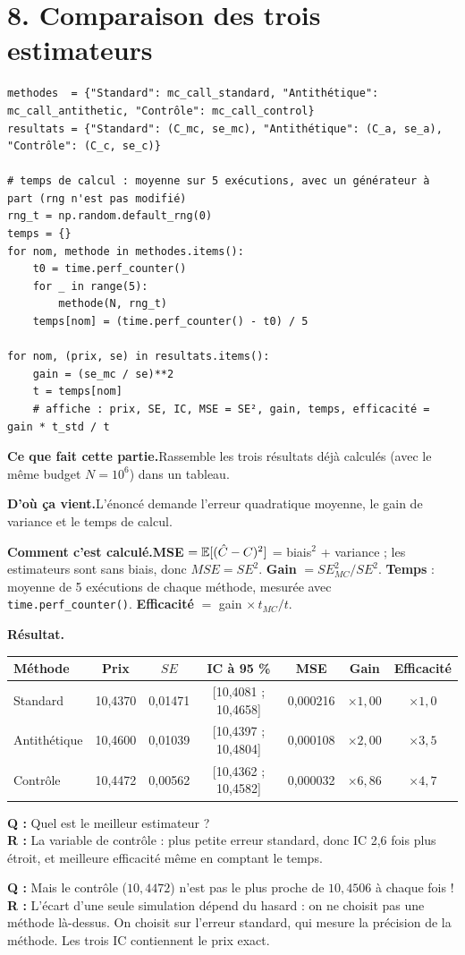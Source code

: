 \documentclass[11pt,a4paper]{article}
\newcommand{\quoi}[1]{\par\noindent\textbf{\color{bleu}Ce que fait cette partie.}\enspace #1\par}
\newcommand{\source}[1]{\par\noindent\textbf{\color{orange}D'où ça vient.}\enspace #1\par}
\newcommand{\calcul}[1]{\par\noindent\textbf{\color{bleu}Comment c'est calculé.}\enspace #1\par}
\newcommand{\resultat}[1]{\par\noindent\textbf{\color{vert}Résultat.}\enspace #1\par}
\newcommand{\prof}[2]{\begin{tcolorbox}[colback=orange!6,colframe=orange!80,boxrule=0.4pt,arc=2pt,left=5pt,right=5pt,top=2pt,bottom=2pt]\small\textbf{Q :} #1\\[1pt]\textbf{R :} #2\end{tcolorbox}}
\newcommand{\sect}[1]{\clearpage\section{#1}}
\begin{document}
\sect{8. Comparaison des trois estimateurs}
\begin{lstlisting}
methodes  = {"Standard": mc_call_standard, "Antithétique": mc_call_antithetic, "Contrôle": mc_call_control}
resultats = {"Standard": (C_mc, se_mc), "Antithétique": (C_a, se_a), "Contrôle": (C_c, se_c)}

# temps de calcul : moyenne sur 5 exécutions, avec un générateur à part (rng n'est pas modifié)
rng_t = np.random.default_rng(0)
temps = {}
for nom, methode in methodes.items():
    t0 = time.perf_counter()
    for _ in range(5):
        methode(N, rng_t)
    temps[nom] = (time.perf_counter() - t0) / 5

for nom, (prix, se) in resultats.items():
    gain = (se_mc / se)**2
    t = temps[nom]
    # affiche : prix, SE, IC, MSE = SE², gain, temps, efficacité = gain * t_std / t
\end{lstlisting}
\quoi{Rassemble les trois résultats déjà calculés (avec le même budget $N = 10^6$) dans un tableau.}
\source{L'énoncé demande l'erreur quadratique moyenne, le gain de variance et le temps de calcul.}
\calcul{\textbf{MSE} $= \mathbb{E}[(\hat C-C)^2]$ = biais$^2$ + variance ; les estimateurs sont sans biais, donc $MSE = SE^2$.
\textbf{Gain} $= SE_{MC}^2/SE^2$. \textbf{Temps} : moyenne de 5 exécutions de chaque méthode, mesurée avec \texttt{time.perf\_counter()}. \textbf{Efficacité} $=$ gain $\times\,t_{MC}/t$.}
\resultat{\small
\begin{tabular}{lcccccc}
\toprule
Méthode & Prix & $SE$ & IC à 95 \% & MSE & Gain & Efficacité \\
\midrule
Standard & 10,4370 & 0,01471 & [10,4081 ; 10,4658] & 0,000216 & $\times1{,}00$ & $\times1{,}0$ \\
Antithétique & 10,4600 & 0,01039 & [10,4397 ; 10,4804] & 0,000108 & $\times2{,}00$ & $\times3{,}5$ \\
Contrôle & 10,4472 & 0,00562 & [10,4362 ; 10,4582] & 0,000032 & $\times6{,}86$ & $\times4{,}7$ \\
\bottomrule
\end{tabular}}
\prof{Quel est le meilleur estimateur ?}{La variable de contrôle : plus petite erreur standard, donc IC 2,6 fois plus étroit, et meilleure efficacité même en comptant le temps.}
\prof{Mais le contrôle ($10{,}4472$) n'est pas le plus proche de $10{,}4506$ à chaque fois !}{L'écart d'une seule simulation dépend du hasard : on ne choisit pas une méthode là-dessus. On choisit sur l'erreur standard, qui mesure la précision de la méthode. Les trois IC contiennent le prix exact.}
\end{document}
